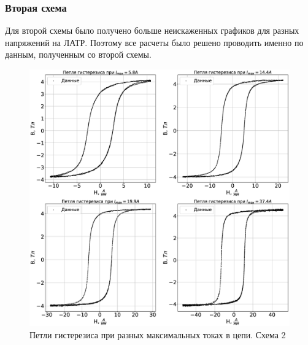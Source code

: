 \documentclass[a4paper,14pt]{extarticle}
\begin{document}
			\subsubsection{Вторая схема}
				Для второй схемы было получено больше неискаженных графиков для разных напряжений на ЛАТР. Поэтому все расчеты было решено проводить именно по данным, полученным со второй схемы.
				\begin{figure}[h]
					\centering
					\includegraphics[width=1.0\linewidth]{Lab2_3.eps}
					\caption{Петли гистерезиса при разных максимальных токах в цепи. Схема 2}
					\label{fig6}
				\end{figure}
				\newpage
\end{document}
